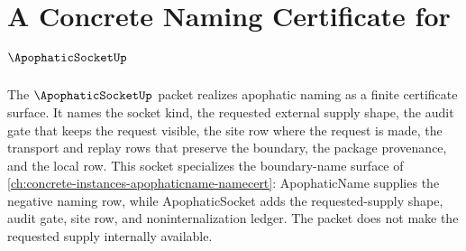 \chapter{A Concrete Naming Certificate for $\ApophaticSocketUp$}
\label{ch:concrete-instances-apophaticsocket-namecert}

The $\ApophaticSocketUp$ packet realizes apophatic naming as a finite certificate surface. It names the socket kind, the requested external supply shape, the audit gate that keeps the request visible, the site row where the request is made, the transport and replay rows that preserve the boundary, the package provenance, and the local \NameCert{} row. This socket specializes the boundary-name surface of \autoref{ch:concrete-instances-apophaticname-namecert}: ApophaticName supplies the negative naming row, while ApophaticSocket adds the requested-supply shape, audit gate, site row, and noninternalization ledger. The packet does not make the requested supply internally available.

